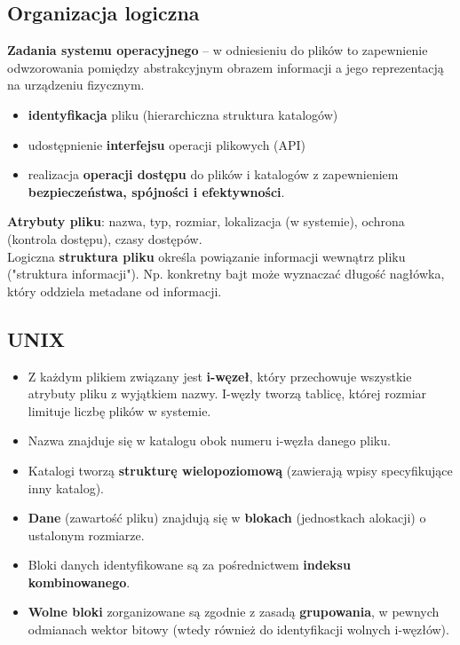 \documentclass[main.tex]{subfiles}
\begin{document}
    \subsection{Organizacja logiczna}
    \textbf{Zadania systemu operacyjnego} -- w odniesieniu do plików to zapewnienie odwzorowania pomiędzy abstrakcyjnym
    obrazem informacji a jego reprezentacją na urządzeniu fizycznym.
    \begin{itemize}[noitemsep]
        \item \textbf{identyfikacja} pliku (hierarchiczna struktura katalogów)
        \item udostępnienie \textbf{interfejsu} operacji plikowych (API)
        \item realizacja \textbf{operacji dostępu} do plików i katalogów z zapewnieniem \textbf{bezpieczeństwa,
        spójności i efektywności}.
    \end{itemize}

    \noindent \textbf{Atrybuty pliku}: nazwa, typ, rozmiar, lokalizacja (w systemie), ochrona (kontrola dostępu),
    czasy dostępów.\\

    \noindent Logiczna \textbf{struktura pliku} określa powiązanie informacji wewnątrz pliku ("struktura informacji").
    Np. konkretny bajt może wyznaczać długość nagłówka, który oddziela metadane od informacji.

    \subsection{UNIX}
    \begin{itemize}[noitemsep]
        \item Z każdym plikiem związany jest \textbf{i-węzeł}, który przechowuje wszystkie atrybuty pliku z wyjątkiem nazwy.
        I-węzły tworzą tablicę, której rozmiar limituje liczbę plików w systemie.
        \item Nazwa znajduje się w katalogu obok numeru i-węzła danego pliku.
        \item Katalogi tworzą \textbf{strukturę wielopoziomową} (zawierają wpisy specyfikujące inny katalog).
        \item \textbf{Dane} (zawartość pliku) znajdują się w \textbf{blokach} (jednostkach alokacji) o ustalonym rozmiarze.
        \item Bloki danych identyfikowane są za pośrednictwem \textbf{indeksu kombinowanego}.
        \item \textbf{Wolne bloki} zorganizowane są zgodnie z zasadą \textbf{grupowania}, w pewnych odmianach wektor
        bitowy (wtedy również do identyfikacji wolnych i-węzłów).
    \end{itemize}
\end{document}
